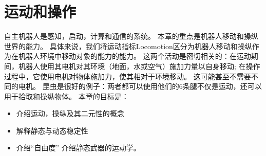 \chapter{运动和操作}\label{chap:locomotion}


自主机器人是感知，启动，计算和通信的系统。 本章的重点是机器人移动和操纵世界的能力。 具体来说，我们将运动指标{Locomotion}区分为机器人移动和操纵作为在机器人环境中移动对象的能力的能力。 这两个活动是密切相关的：在运动期间，机器人使用其电机对其环境（地面，水或空气）施加力量以自身移动; 在操作过程中，它使用电机对物体施加力，使其相对于环境移动。 这可能甚至不需要不同的电机。 昆虫是很好的例子：两者都可以使用他们的6条腿不仅是运动，还可以用于拾取和操纵物体。 本章的目标是：

\begin{itemize}
\item 介绍运动，操纵及其二元性的概念
\item 解释静态与动态稳定性
\item 介绍“自由度”
介绍静态武器的运动学。
\end{itemize}


